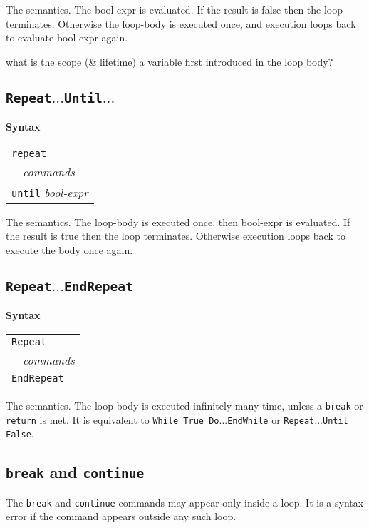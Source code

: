 \documentclass{book}[12,a4paper]
\def\mydots{$...$}
\newenvironment{syntax}
{\goodbreak\noindent\textbf{Syntax}\\
 \begin{tabular}{|p{0.9\textwidth}|}\hline}
{\\\hline\end{tabular}}
\begin{document}
The semantics.  The bool-expr is evaluated.  If the result is false
then the loop terminates.  Otherwise the loop-body is executed once,
and execution loops back to evaluate bool-expr again.

 what is the scope (\& lifetime) a variable first
introduced in the loop body?

\subsection{\texttt{Repeat\mydots Until\mydots}}
\label{keyword:repeat}

\begin{syntax}
\texttt{repeat}\\ 
\ \ \textit{commands}\\
\texttt{until} \textit{bool-expr}
\end{syntax}

The semantics.  The loop-body is executed once, then bool-expr is
evaluated.  If the result is true then the loop terminates.  Otherwise
execution loops back to execute the body once again.

\subsection{\texttt{Repeat\mydots EndRepeat}}
\label{keyword:repeat}

\begin{syntax}
\texttt{Repeat}\\ 
\ \ \textit{commands}\\
\texttt{EndRepeat}
\end{syntax}

The semantics.  The loop-body is executed infinitely many time, unless
a \texttt{break} or \texttt{return} is met.
It is equivalent to \texttt{While True Do\mydots EndWhile}
or \texttt{Repeat\mydots Until False}.

\subsection{\texttt{break} and \texttt{continue}}
\label{keyword:break}

The \texttt{break} and \texttt{continue} commands may appear only inside a
loop.  It is a syntax error if the command appears outside any such loop.
\end{document}
